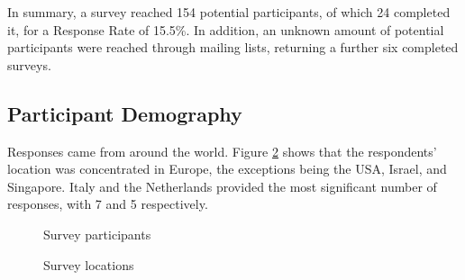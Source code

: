 In summary, a survey reached 154 potential participants, of which 24 completed it, for a Response Rate of 15.5\%.
In addition, an unknown amount of potential participants were reached through mailing lists, returning a further six completed surveys.

\subsection{Participant Demography}

Responses came from around the world.
Figure \ref{fig:Survey_locations} shows that the respondents' location was concentrated in Europe, the exceptions being the USA, Israel, and Singapore.
Italy and the Netherlands provided the most significant number of responses, with 7 and 5 respectively.

\begin{figure}[H]
    \centering
    \caption{Survey participants}
    \label{fig:Survey_participants}
\end{figure}

\begin{figure}[H]
    \centering
    \caption{Survey locations}
    \label{fig:Survey_locations}
\end{figure}

